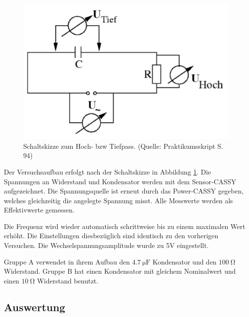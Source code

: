 \documentclass[12pt,a4paper]{article}
\begin{document}
\begin{figure}
\centering
\includegraphics[scale=1.0]{Bilder/AufbauHochTief.png}
\caption{Schaltskizze zum Hoch- bzw Tiefpass. (Quelle: Praktikumsskript S. 94)}
\label{fig:AufbauHochTief}
\end{figure}

Der Versuchsaufbau erfolgt nach der Schaltskizze in Abbildung \ref{fig:AufbauHochTief}. Die Spannungen an Widerstand und Kondensator
werden mit dem Sensor-CASSY aufgezeichnet. Die Spannungsquelle ist erneut durch das Power-CASSY gegeben, welches gleichzeitig die angelegte Spannung misst. Alle Messwerte werden als Effektivwerte gemessen.

Die Frequenz wird wieder automatisch schrittweise bis zu einem maximalen Wert erhöht. Die Einstellungen diesbezüglich sind identisch zu den vorherigen Versuchen. Die Wechselspannungsamplitude wurde zu 5V eingestellt.

Gruppe A verwendet in ihrem Aufbau den $\SI{4,7}{\micro \F}$ Kondensator und den $\SI{100}{\ohm}$ Widerstand. Gruppe B hat einen Kondensator mit gleichem Nominalwert und einen $\SI{10}{\ohm}$ Widerstand benutzt.

\subsection{Auswertung}
\end{document}
